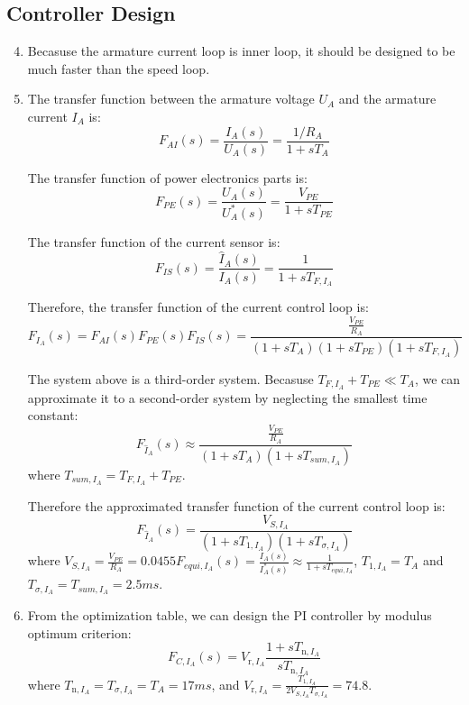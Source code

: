 \documentclass[12pt,a4paper, openany]{book}
\begin{document}
\subsection{Controller Design}

\begin{enumerate}
\setcounter{enumi}{3} %
\item {\bf *} Becasuse the armature current loop is inner loop, it should be designed to be much faster than the speed loop. 
\item {\bf *} 
The transfer function between the armature voltage $U_A$ and the armature current $I_A$ is:
\begin{equation}
    F_{AI}(s) = \frac{I_A(s)}{U_A(s)} = \frac{1/R_A}{1 + sT_A}
\end{equation}

The transfer function of power electronics parts is:
\begin{equation}
    F_{PE}(s) = \frac{U_A(s)}{U^*_A(s)} = \frac{V_{PE}}{1 + sT_{PE}}
\end{equation}

The transfer function of the current sensor is:
\begin{equation}
    F_{IS}(s) = \frac{\hat{I}_A(s)}{I_A(s)} = \frac{1}{1 + sT_{F,I_A}}
\end{equation}

Therefore, the transfer function of the current control loop is:
\begin{equation}
    F_{I_A}(s) = F_{AI}(s) F_{PE}(s) F_{IS}(s)= \frac{\frac{V_{PE}}{R_A}}{(1 + sT_A)(1 + sT_{PE})(1 + sT_{F,I_A})}
\end{equation}

The system above is a third-order system. Becasuse $T_{F,I_A}+T_{PE} \ll T_A$, we can approximate it to a second-order system by neglecting the smallest time constant:
\begin{equation}
    F_{\hat{I}_A}(s) \approx \frac{\frac{V_{PE}}{R_A}}{(1 + sT_A)(1 + sT_{sum,I_A})}
\end{equation}
where $T_{sum,I_A} = T_{F,I_A} + T_{PE}$.

Therefore the approximated transfer function of the current control loop is:
\begin{equation}
    F_{\hat{I}_A}(s)= \frac{V_{S,I_A}}{(1+sT_{1,I_A})(1+sT_{\sigma,I_A})}
\end{equation}
where $V_{S,I_A} = \frac{V_{PE}}{R_A}=0.0455F_{equi,I_A}(s)=\frac{I_A(s)}{I_A^*(s)}\approx\frac{1}{1+sT_{equi,I_A}}$, $T_{1,I_A} = T_A$ and $T_{\sigma,I_A} = T_{sum,I_A}=2.5ms$.
\item {\bf *} From the optimization table, we can design the PI controller by modulus optimum criterion:
\begin{equation}
    F_{C,I_A}(s)=V_{\mathrm{r},I_A}\frac{1+sT_{\mathrm{n},I_A}}{sT_{\mathrm{n},I_A}}
\end{equation}
where $T_{\mathrm{n},I_A} = T_{\sigma,I_A}=T_A=17ms$, and $V_{\mathrm{r},I_A} = \frac{T_{1,I_A}}{2V_{S,I_A}T_{\sigma,I_A}} = 74.8$. 
\end{enumerate}
\end{document}
